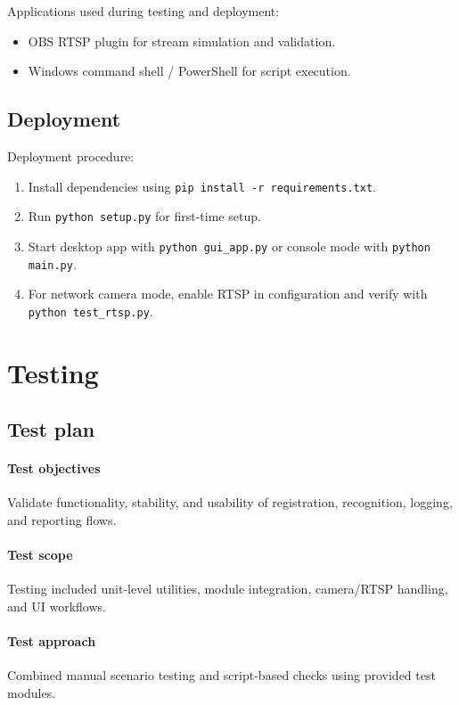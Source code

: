 \documentclass{fisatprojectfinal}
\begin{document}
Applications used during testing and deployment:
\begin{itemize}
	\item OBS RTSP plugin for stream simulation and validation.
	\item Windows command shell / PowerShell for script execution.
\end{itemize}

\section{Deployment}
Deployment procedure:
\begin{enumerate}
	\item Install dependencies using \texttt{pip install -r requirements.txt}.
	\item Run \texttt{python setup.py} for first-time setup.
	\item Start desktop app with \texttt{python gui\_app.py} or console mode with \texttt{python main.py}.
	\item For network camera mode, enable RTSP in configuration and verify with \texttt{python test\_rtsp.py}.
\end{enumerate}

\chapter{Testing}

\section{Test plan}
\subsubsection*{Test objectives}
Validate functionality, stability, and usability of registration, recognition, logging, and reporting flows.

\subsubsection*{Test scope}
Testing included unit-level utilities, module integration, camera/RTSP handling, and UI workflows.

\subsubsection*{Test approach}
Combined manual scenario testing and script-based checks using provided test modules.
\end{document}
